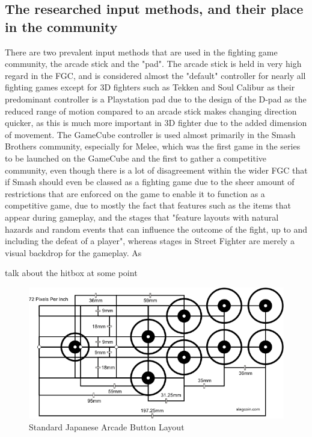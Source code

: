 \documentclass[journal]{IEEEtran}
\begin{document}
\subsection{The researched input methods, and their place in the community} \label{A*PF}
There are two prevalent input methods that are used in the fighting game community, the arcade stick and the "pad". The arcade stick is held in very high regard in the FGC, and is considered almost the "default" controller for nearly all fighting games\cite{Su:2010:SFI:1718918.1718981} except for 3D fighters such as Tekken and Soul Calibur as their predominant controller is a Playstation pad due to the design of the D-pad\cite{controllerchoice} as the reduced range of motion compared to an arcade stick makes changing direction quicker, as this is much more important in 3D fighter due to the added dimension of movement. The GameCube controller is used almost primarily in the Smash Brothers community, especially for Melee, which was the first game in the series to be launched on the GameCube and the first to gather a competitive community, even though there is a lot of disagreement within the wider FGC that if Smash should even be classed as a fighting game due to the sheer amount of restrictions that are enforced on the game to enable it to function as a competitive game, due to mostly the fact that features such as the items that appear during gameplay, and the stages that "feature layouts with natural hazards and random events
that can influence the outcome of the fight, up to and including the defeat of a player"\cite{harper2010art}, whereas stages in Street Fighter are merely a visual backdrop for the gameplay. As  

talk about the hitbox at some point
\begin{figure}
    \centering
    \includegraphics[width=1.0\linewidth]{hori36_s.png}
    \caption{Standard Japanese Arcade Button Layout\cite{panellayout}}
    \label{fig:buttonlayout}
\end{figure}
\end{document}
